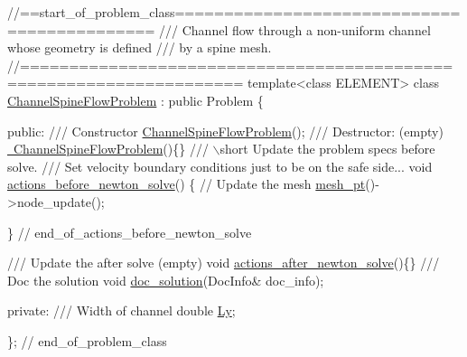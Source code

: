  
\begin{DoxyCodeInclude}
\textcolor{comment}{//==start\_of\_problem\_class============================================}
\textcolor{comment}{/// Channel flow through a non-uniform channel whose geometry is defined }
\textcolor{comment}{}\textcolor{comment}{/// by a spine mesh.}
\textcolor{comment}{}\textcolor{comment}{//====================================================================}
\textcolor{keyword}{template}<\textcolor{keyword}{class} ELEMENT>
\textcolor{keyword}{class }\hyperlink{classChannelSpineFlowProblem}{ChannelSpineFlowProblem} : \textcolor{keyword}{public} Problem
\{

\textcolor{keyword}{public}:
\textcolor{comment}{}
\textcolor{comment}{ /// Constructor}
\textcolor{comment}{} \hyperlink{classChannelSpineFlowProblem_a23f1b987e3395b1d101eaf3f3b5c94b2}{ChannelSpineFlowProblem}();
 \textcolor{comment}{}
\textcolor{comment}{ /// Destructor: (empty)}
\textcolor{comment}{} \hyperlink{classChannelSpineFlowProblem_abdf2cc520915167d8718499459df348b}{~ChannelSpineFlowProblem}()\{\}
\textcolor{comment}{}
\textcolor{comment}{ /// \(\backslash\)short Update the problem specs before solve. }
\textcolor{comment}{ /// Set velocity boundary conditions just to be on the safe side...}
\textcolor{comment}{} \textcolor{keywordtype}{void} \hyperlink{classChannelSpineFlowProblem_aaf6dd8a8a472ccd938df579aba61ec97}{actions\_before\_newton\_solve}()
  \{ 
   \textcolor{comment}{// Update the mesh}
   \hyperlink{classChannelSpineFlowProblem_ab68c7ab5406b90a0ef56c39b67f83a09}{mesh\_pt}()->node\_update();

  \} \textcolor{comment}{// end\_of\_actions\_before\_newton\_solve}

\textcolor{comment}{}
\textcolor{comment}{ /// Update the after solve (empty)}
\textcolor{comment}{} \textcolor{keywordtype}{void} \hyperlink{classChannelSpineFlowProblem_a419a80ef3d19438f193bd7843f72446a}{actions\_after\_newton\_solve}()\{\}
\textcolor{comment}{}
\textcolor{comment}{ /// Doc the solution}
\textcolor{comment}{} \textcolor{keywordtype}{void} \hyperlink{classChannelSpineFlowProblem_a101bdeee56502231945cbac272ca21f6}{doc\_solution}(DocInfo& doc\_info);

\textcolor{keyword}{private}:
 \textcolor{comment}{}
\textcolor{comment}{ /// Width of channel}
\textcolor{comment}{} \textcolor{keywordtype}{double} \hyperlink{classChannelSpineFlowProblem_a6ac51c3c9d400869e694fe00452e293f}{Ly};

 
\}; \textcolor{comment}{// end\_of\_problem\_class}

\end{DoxyCodeInclude}


